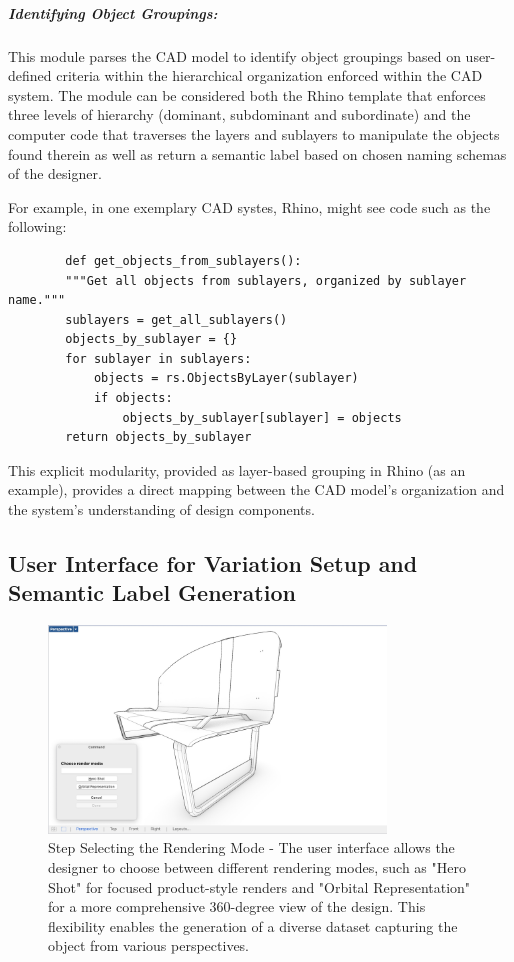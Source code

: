 \documentclass[12pt]{report}
\begin{document}
\subparagraph{Identifying Object Groupings:} This module parses the CAD model to identify object groupings based on user-defined criteria within the hierarchical organization enforced within the CAD system. The module can be considered both the Rhino template that enforces three levels of hierarchy (dominant, subdominant and subordinate) and the computer code that traverses the layers and sublayers to manipulate the objects found therein as well as return a semantic label based on chosen naming schemas of the designer.

For example, in one exemplary  CAD systes, Rhino, might see code such as the following: 

    \begin{verbatim}
        def get_objects_from_sublayers():
        """Get all objects from sublayers, organized by sublayer name."""
        sublayers = get_all_sublayers()
        objects_by_sublayer = {}
        for sublayer in sublayers:
            objects = rs.ObjectsByLayer(sublayer)
            if objects:
                objects_by_sublayer[sublayer] = objects
        return objects_by_sublayer
    \end{verbatim}  

This explicit modularity, provided as layer-based grouping in Rhino (as an example), provides a direct mapping between the CAD model's organization and the system's understanding of design components.


\subsection{User Interface for Variation Setup and Semantic Label Generation}

\begin{figure}[h]
    \centering
    \includegraphics[width=0.8\textwidth]{figures/figure-process-choose-render-mode-monochrome.jpg} 
    \caption{Step   Selecting the Rendering Mode - The user interface allows the designer to choose between different rendering modes, such as "Hero Shot" for focused product-style renders and "Orbital Representation" for a more comprehensive 360-degree view of the design. This flexibility enables the generation of a diverse dataset capturing the object from various perspectives.}
    \label{fig:render_mode_selection_unique}

\end{figure}
\end{document}
